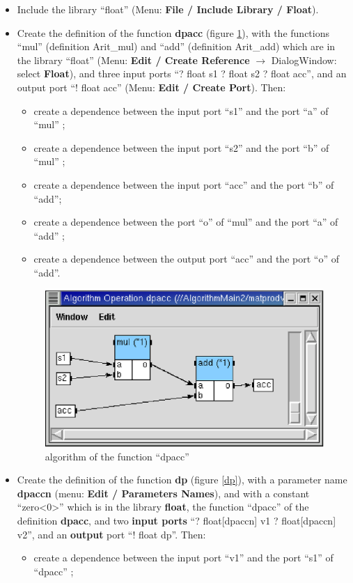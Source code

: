 \documentclass[a4paper,twoside]{report}
\begin{document}
\begin{itemize}
\item Include the library ``float'' (Menu: \textbf{File / Include Library / Float}).

\item Create the definition of the function \textbf{dpacc} (figure
\ref{dpacc}), with the functions ``mul'' (definition Arit\_mul) and ``add''
(definition Arit\_add) which are in the library
``float'' (Menu: \textbf{Edit / Create Reference} $\rightarrow$ DialogWindow:
select \textbf{Float}), and three input ports ``?  float s1 ?  float s2 ?
float acc'', and an output port ``!  float acc'' (Menu: \textbf{Edit / Create
  Port}). Then:
\begin{itemize}
\item create a dependence between the input port ``s1'' and the port ``a'' of ``mul'' ;

\item create a dependence between the input port ``s2'' and the port ``b'' of ``mul'' ;

\item create a dependence between the input port ``acc'' and the port ``b'' of ``add''; 

\item create a dependence between the port ``o'' of ``mul'' and the port ``a'' of
``add'' ;

\item create a dependence between the output port ``acc'' and the port ``o'' of
``add''.
\end{itemize}
\begin{figure}[htbp]
  \begin{center} 
        \includegraphics[width=0.55\linewidth]{algorithm_ex4_dpacc.eps} 
  \end{center}
  \caption{algorithm of the function ``dpacc''}
  \label{dpacc}
\end{figure}

\item Create the definition of the function \textbf{dp} (figure \ref{dp}),
with a parameter name \textbf{dpaccn} (menu: \textbf{Edit / Parameters Names}),
and with a constant ``zero<{0}>'' which is in the library \textbf{float}, the
function ``dpacc'' of the definition \textbf{dpacc}, and two \textbf{input
ports} ``?  float[dpaccn] v1 ? float[dpaccn] v2'', and an \textbf{output} port
``!  float dp''. Then:
\begin{itemize}
\item create a dependence between the input port ``v1'' and the port ``s1'' of
``dpacc'' ;


\end{itemize}
\end{itemize}
\end{document}
